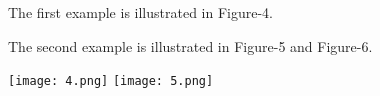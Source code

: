 The first example is illustrated in Figure-4.

The second example is illustrated in Figure-5 and Figure-6.


\texttt{[image: 4.png]}
\texttt{[image: 5.png]}